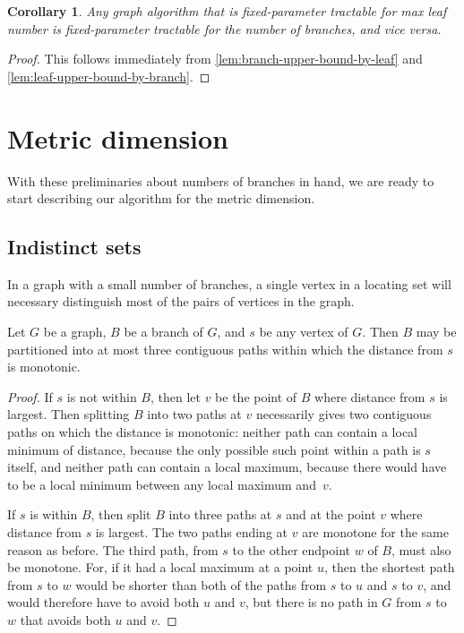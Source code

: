 \documentclass{jgaa-art}
\newtheorem{corollary}{Corollary}
\begin{document}
\begin{corollary}
\label{cor:equiv-params}
Any graph algorithm that is fixed-parameter tractable for max leaf number is fixed-parameter tractable for the number of branches, and vice versa.
\end{corollary}

\begin{proof}
This follows immediately from \autoref{lem:branch-upper-bound-by-leaf} and \autoref{lem:leaf-upper-bound-by-branch}.
\end{proof}

\section{Metric dimension}

With these preliminaries about numbers of branches in hand, we are ready to start describing our algorithm for the metric dimension.

\subsection{Indistinct sets}

In a graph with a small number of branches, a single vertex in a locating set will necessary distinguish most of the pairs of vertices in the graph.

\begin{lemma}
\label{lem:monotonic}
Let $G$ be a graph, $B$ be a branch of $G$, and $s$ be any vertex of $G$. Then $B$ may be partitioned into at most three contiguous paths within which the distance from $s$ is monotonic.
\end{lemma}

\begin{proof}
If $s$ is not within $B$, then let $v$ be the point of $B$ where distance from $s$ is largest. Then splitting $B$ into two paths at $v$ necessarily gives two contiguous paths on which the distance is monotonic: neither path can contain a local minimum of distance, because the only possible such point within a path is $s$ itself, and neither path can contain a local maximum, because there would have to be a local minimum between any local maximum and~$v$.

If $s$ is within $B$, then split $B$ into three paths at $s$ and at the point $v$ where distance from $s$ is largest. The two paths ending at $v$ are monotone for the same reason as before. The third path, from $s$ to the other endpoint $w$ of $B$, must also be monotone. For, if it had a local maximum at a point $u$, then the shortest path from $s$ to $w$ would be shorter than both of the paths from $s$ to $u$ and $s$ to $v$, and would therefore have to avoid both $u$ and $v$, but there is no path in $G$ from $s$ to $w$ that avoids both $u$ and $v$.
\end{proof}
\end{document}
